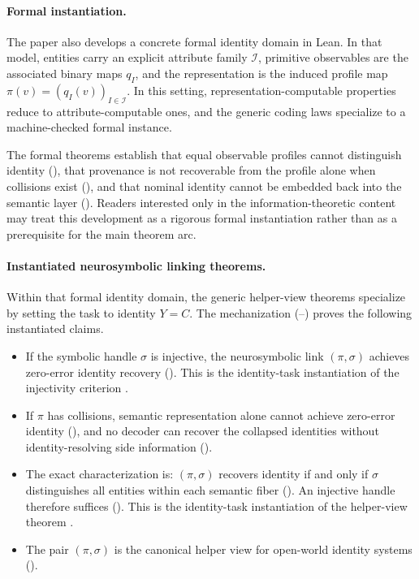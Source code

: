 \paragraph{Formal instantiation.}
The paper also develops a concrete formal identity domain in Lean. In that model, entities carry an explicit attribute family $\mathcal I$, primitive observables are the associated binary maps $q_I$, and the representation is the induced profile map $\pi(v)=(q_I(v))_{I\in\mathcal I}$. In this setting, representation-computable properties reduce to attribute-computable ones, and the generic coding laws specialize to a machine-checked formal instance.

The formal theorems establish that equal observable profiles cannot distinguish identity (), that provenance is not recoverable from the profile alone when collisions exist (), and that nominal identity cannot be embedded back into the semantic layer (). Readers interested only in the information-theoretic content may treat this development as a rigorous formal instantiation rather than as a prerequisite for the main theorem arc.

\paragraph{Instantiated neurosymbolic linking theorems.}
Within that formal identity domain, the generic helper-view theorems specialize by setting the task to identity $Y = C$. The mechanization (--) proves the following instantiated claims.

\begin{itemize}
\item If the symbolic handle $\sigma$ is injective, the neurosymbolic link $(\pi, \sigma)$ achieves zero-error identity recovery (). This is the identity-task instantiation of the injectivity criterion .

\item If $\pi$ has collisions, semantic representation alone cannot achieve zero-error identity (), and no decoder can recover the collapsed identities without identity-resolving side information ().

\item The exact characterization is: $(\pi, \sigma)$ recovers identity if and only if $\sigma$ distinguishes all entities within each semantic fiber (). An injective handle therefore suffices (). This is the identity-task instantiation of the helper-view theorem .

\item The pair $(\pi, \sigma)$ is the canonical helper view for open-world identity systems ().
\end{itemize}

